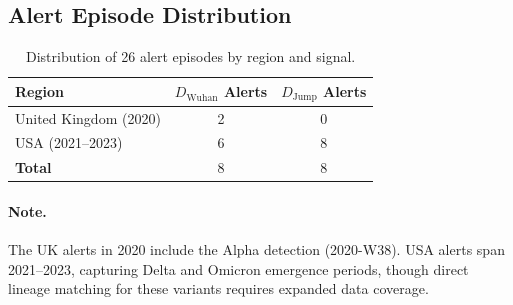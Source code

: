 \documentclass[11pt]{article}
\begin{document}
\subsection{Alert Episode Distribution}
\begin{table}[H]
\centering
\caption{Distribution of 26 alert episodes by region and signal.}
\label{tab:alerts}
\begin{tabular}{lcc}
\toprule
\textbf{Region} & \textbf{$D_{\text{Wuhan}}$ Alerts} & \textbf{$D_{\text{Jump}}$ Alerts} \\
\midrule
United Kingdom (2020) & 2 & 0 \\
USA (2021--2023) & 6 & 8 \\
\midrule
\textbf{Total} & 8 & 8 \\
\bottomrule
\end{tabular}
\end{table}

\paragraph{Note.} The UK alerts in 2020 include the Alpha detection (2020-W38). USA alerts span 2021--2023, capturing Delta and Omicron emergence periods, though direct lineage matching for these variants requires expanded data coverage.

\end{document}
